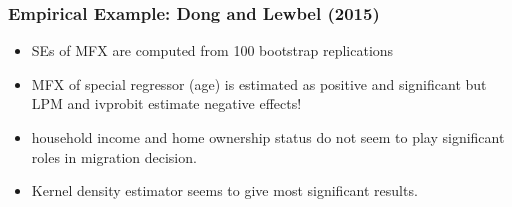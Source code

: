\documentclass[11pt,dvipsnames,table,aspectratio=169]{beamer}
\begin{document}
\begin{frame}
\frametitle{Empirical Example: Dong and Lewbel (2015)}

\begin{itemize}
\item SEs of MFX are computed from 100 bootstrap replications
\item MFX of special regressor (age) is estimated as positive and significant but LPM and ivprobit estimate negative effects!
\item household income and home ownership status do not seem to play significant roles in migration decision.
\item Kernel density estimator seems to give most significant results.
\end{itemize}
\end{frame}


%        

          
\end{document}
